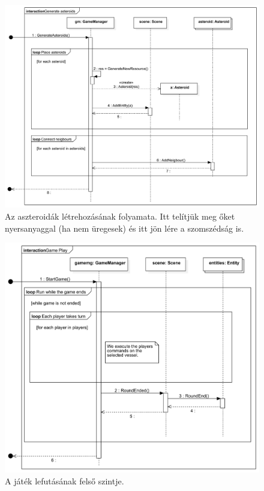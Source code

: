 \begin{figure}[H] 
\centering 
\includegraphics[width=1\textwidth]{docs/3_Project/svg/Design Model!Game Init!Generate asteroids!Generate asteroids_27.png} 
\caption{Az aszteroidák létrehozásának folyamata. Itt telítjük meg őket nyersanyaggal (ha nem üregesek) és itt jön lére a szomszédság is.} 
\end{figure} 

\begin{figure}[H] 
\centering 
\includegraphics[width=1\textwidth]{docs/3_Project/svg/Design Model!Game play!Game Play!Game Play_28.png} 
\caption{A játék lefutásának felső szintje.} 
\end{figure} 

